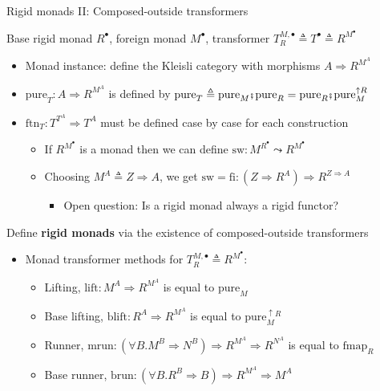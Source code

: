 \documentclass[english]{beamer}
\newcommand{\bef}{\hspace{0.5pt}\ensuremath\mathsmaller{\fatsemi}\hspace{1.5pt}}
\begin{document}
\begin{frame}{Rigid monads II: Composed-outside transformers}

Base rigid monad $R^{\bullet}$, foreign monad $M^{\bullet}$, transformer
{\footnotesize{}$T_{R}^{M,\bullet}\triangleq T^{\bullet}\triangleq R^{M^{\bullet}}$}{\footnotesize\par}
\begin{itemize}
\item Monad instance: define the Kleisli category with morphisms $A\Rightarrow R^{M^{A}}$
\item $\text{pure}_{T}:A\Rightarrow R^{M^{A}}$ is defined by {\footnotesize{}$\text{pure}_{T}\triangleq\text{pure}_{M}\bef\text{pure}_{R}=\text{pure}_{R}\bef\text{pure}_{M}^{\uparrow R}$}{\footnotesize\par}
\item $\text{ftn}_{T}:T^{T^{A}}\Rightarrow T^{A}$ must be defined case
by case for each construction
\begin{itemize}
\item If $R^{M^{\bullet}}$ is a monad then we can define $\text{sw}:M^{R^{\bullet}}\leadsto R^{M^{\bullet}}$
\item Choosing $M^{A}\triangleq Z\Rightarrow A$, we get $\text{sw}=\text{fi}:\left(Z\Rightarrow R^{A}\right)\Rightarrow R^{Z\Rightarrow A}$
\begin{itemize}
\item Open question: Is a rigid monad always a rigid functor?
\end{itemize}
\end{itemize}
\end{itemize}
Define \textbf{rigid monads} via the existence of composed-outside
transformers
\begin{itemize}
\item Monad transformer methods for $T_{R}^{M,\bullet}\triangleq R^{M^{\bullet}}$:
\begin{itemize}
\item Lifting, $\text{lift}:M^{A}\Rightarrow R^{M^{A}}$ is equal to $\text{pure}_{M}$
\item Base lifting, $\text{blift}:R^{A}\Rightarrow R^{M^{A}}$ is equal
to $\text{pure}_{M}^{\uparrow R}$
\item Runner, $\text{mrun}:\left(\forall B.M^{B}\Rightarrow N^{B}\right)\Rightarrow R^{M^{A}}\Rightarrow R^{N^{A}}$
is equal to $\text{fmap}_{R}$
\item Base runner, $\text{brun}:\left(\forall B.R^{B}\Rightarrow B\right)\Rightarrow R^{M^{A}}\Rightarrow M^{A}$

\end{itemize}
\end{itemize}
\end{frame}
\end{document}

